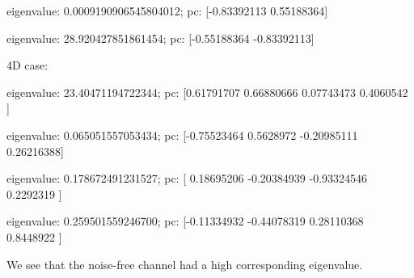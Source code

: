 \documentclass[]{scrartcl}
\begin{document}
\par eigenvalue: 0.0009190906545804012; pc: [-0.83392113  0.55188364]
\par eigenvalue: 28.920427851861454; pc: [-0.55188364 -0.83392113]

\bigskip
\par 4D case:
\par eigenvalue: 23.40471194722344; pc: [0.61791707 0.66880666 0.07743473 0.4060542 ]
\par eigenvalue: 0.065051557053434; pc: [-0.75523464  0.5628972  -0.20985111  0.26216388]
\par eigenvalue: 0.178672491231527; pc: [ 0.18695206 -0.20384939 -0.93324546  0.2292319 ]
\par eigenvalue: 0.259501559246700; pc: [-0.11334932 -0.44078319  0.28110368  0.8448922 ]
\bigskip

We see that the noise-free channel had a high corresponding eigenvalue. 
\end{document}
